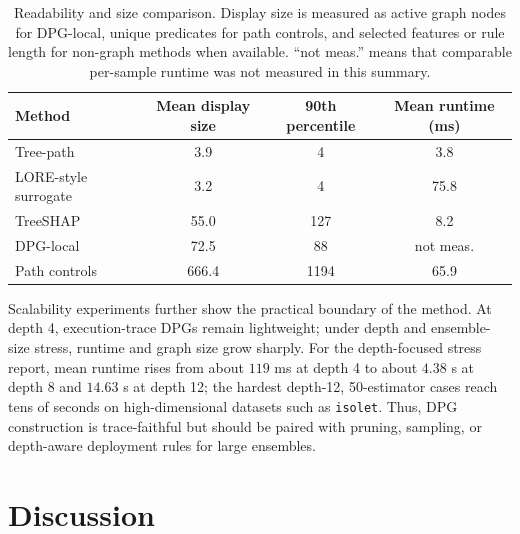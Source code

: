 \documentclass[runningheads]{llncs}
\begin{document}
\begin{table}[ht!]
\centering
\small
\caption{Readability and size comparison. Display size is measured as active graph nodes for DPG-local, unique predicates for path controls, and selected features or rule length for non-graph methods when available. ``not meas.'' means that comparable per-sample runtime was not measured in this summary.}
\label{tab:readability-cost}
\begin{tabular}{lccc}
\toprule
Method & Mean display size & 90th percentile & Mean runtime (ms) \\
\midrule
Tree-path             & 3.9   & 4    & 3.8 \\
LORE-style surrogate  & 3.2   & 4    & 75.8 \\
TreeSHAP              & 55.0  & 127  & 8.2 \\
DPG-local             & 72.5  & 88   & not meas. \\
Path controls         & 666.4 & 1194 & 65.9 \\
\bottomrule
\end{tabular}
\end{table}

Scalability experiments further show the practical boundary of the method. At depth 4, execution-trace DPGs remain lightweight; under depth and ensemble-size stress, runtime and graph size grow sharply. For the depth-focused stress report, mean runtime rises from about $119$ ms at depth 4 to about $4.38$ s at depth 8 and $14.63$ s at depth 12; the hardest depth-12, 50-estimator cases reach tens of seconds on high-dimensional datasets such as \texttt{isolet}. Thus, DPG construction is trace-faithful but should be paired with pruning, sampling, or depth-aware deployment rules for large ensembles.

\section{Discussion}
\label{sec:discussion}
\end{document}
